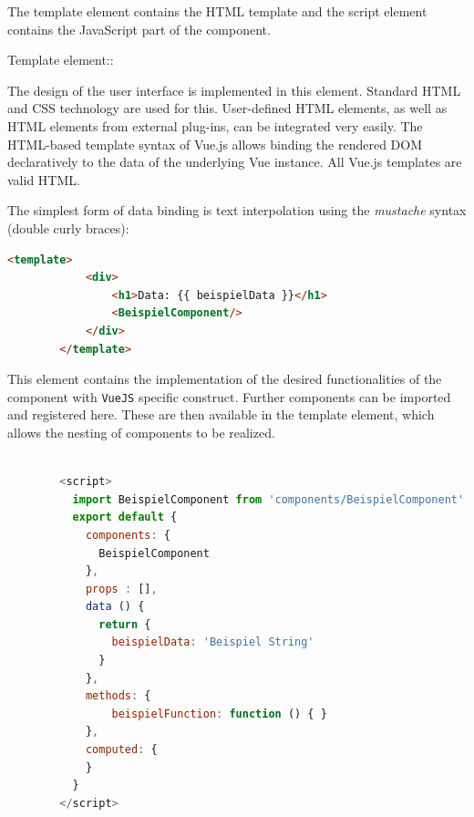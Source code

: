 
The template element contains the HTML template and the script element contains the JavaScript part of the component.
\begin{labeling}{Template element::}
	\item [Template element:] The design of the user interface is implemented in this element. Standard HTML and CSS technology are used for this. User-defined HTML elements, as well as HTML elements from external plug-ins, can be integrated very easily. The HTML-based template syntax of Vue.js allows binding the rendered DOM declaratively to the data of the underlying Vue instance. All Vue.js templates are valid HTML.
	
	The simplest form of data binding is text interpolation using the \textit{mustache} syntax (double curly braces):
	\begin{lstlisting}[language=html,label={lst:label}, caption=Templateelement]
        <template>
            <div>
                <h1>Data: {{ beispielData }}</h1>
                <BeispielComponent/>
            </div>
        </template>    
        \end{lstlisting}
		\item [Script element:] This element contains the implementation of the desired functionalities of the component with \texttt{VueJS} specific construct. Further components can be imported and registered here. These are then available in the template element, which allows the nesting of components to be realized.
	\begin{lstlisting}[language=JavaScript,label={lst:label}, caption=Skriptelement]
        
        <script>
          import BeispielComponent from 'components/BeispielComponent'
          export default {
            components: {
              BeispielComponent
            },
            props : [],
            data () {
              return {
                beispielData: 'Beispiel String'
              }
            },
            methods: {
                beispielFunction: function () { }
            },
            computed: {
            }
          }
        </script>
        
        \end{lstlisting}
\end{labeling}



